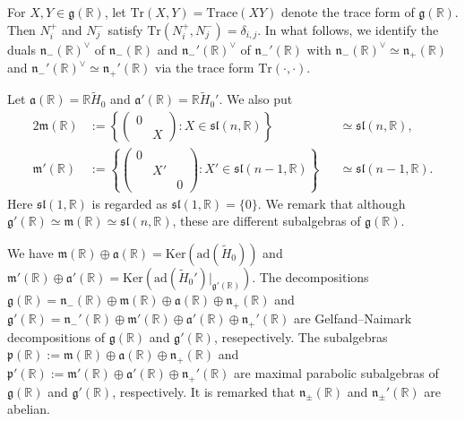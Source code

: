 \documentclass[reqno,11pt]{amsart}
\theoremstyle{remark}
\theoremstyle{definition}
\numberwithin{equation}{section}
\newcommand{\fa}{{\mathfrak a}}
\newcommand{\fg}{{\mathfrak g}}
\newcommand{\fm}{{\mathfrak m}}
\newcommand{\fn}{{\mathfrak n}}
\newcommand{\fp}{{\mathfrak p}}
\newcommand{\f}{\mathfrak}
\newcommand{\R}{\mathbb{R}}
\newcommand{\ad}{\mathrm{ad}}
\newcommand{\Tr}{\text{Tr}}
\newcommand{\wH}{\widetilde{H}}
\newcommand{\Ker}{\mathrm{Ker}}
\begin{document}
For $X, Y \in \fg(\R)$, let $\Tr(X,Y)=\text{Trace}(XY)$ denote the trace form of $\fg(\R)$. 
Then $N_i^+$ and $N_j^-$ satisfy $\Tr(N_i^+,N_j^-)=\delta_{i,j}$.
In what follows, we identify the duals $\fn_-(\R)^\vee$ of $\fn_-(\R)$
and $\fn_-'(\R)^\vee$ of $\fn_-'(\R)$
with $\fn_-(\R)^\vee \simeq \fn_+(\R)$ and 
$\fn_-'(\R)^\vee \simeq \fn_+'(\R)$
via the trace form $\Tr(\cdot, \cdot)$.

Let $\fa(\R)= \R \wH_0$ and $\fa'(\R)=\R\wH_0'$.
We also put
\begin{alignat*}{2}%
\fm(\R)&:= \left\{
\begin{pmatrix}
0 & \\
 & X
\end{pmatrix}
:
X \in \f{sl}(n,\R)
\right\}
&&\simeq \f{sl}(n,\R),\\
\fm'(\R)&:= \left\{
\begin{pmatrix}
0 && \\
 & X' &\\
 & & 0
\end{pmatrix}
:
X' \in \f{sl}(n-1,\R)
\right\}&&\simeq \f{sl}(n-1,\R).
\end{alignat*}
Here $\f{sl}(1,\R)$ is regarded as $\f{sl}(1,\R)=\{0\}$. 
We remark that although $\fg'(\R) \simeq \fm(\R) \simeq \f{sl}(n,\R)$, these are 
different subalgebras of $\fg(\R)$. 


We have 
$\fm(\R)\oplus \fa(\R) = \Ker(\ad(\widetilde{H}_0))$
 and
 $\fm'(\R)\oplus \fa'(\R) = \Ker(\ad(\widetilde{H}_0')\vert_{\fg'(\R)})$.
 The decompositions
$\fg(\R) = \fn_-(\R) \oplus \fm(\R) \oplus \fa(\R) \oplus \fn_+(\R)$
and
$\fg'(\R) = \fn_-'(\R) \oplus \fm'(\R) \oplus \fa'(\R) \oplus \fn_+'(\R)$
are Gelfand--Naimark decompositions of $\fg(\R)$ and $\fg'(\R)$, resepectively.
The subalgebras
$\fp(\R):=\fm(\R) \oplus \fa(\R) \oplus \fn_+(\R)$ and
$\fp'(\R):=\fm'(\R) \oplus \fa'(\R) \oplus \fn_+'(\R)$ 
are maximal parabolic 
subalgebras of $\fg(\R)$ and $\fg'(\R)$, respectively.
It is remarked that $\fn_{\pm}(\R)$ and $\fn_{\pm}'(\R)$ are abelian. 
\end{document}
